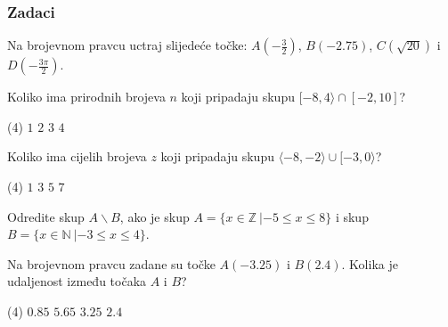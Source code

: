 \newpage

\subsubsection{Zadaci}

\setcounter{zadatak}{0}

\begin{zadatak}
    Na brojevnom pravcu uctraj slijedeće točke: $A\displaystyle \left(-\frac{3}{2}\right)$, $B(-2.75)$, $C\left(\sqrt{20}\right)$ i $D\left(\displaystyle-\frac{3\pi}{2}\right)$.

	\begin{center}\vspace{0.25cm}
	\end{center}
\end{zadatak}

\begin{zadatak}
    Koliko ima prirodnih brojeva $n$ koji pripadaju skupu $[ -8, 4 \rangle \cap [-2, 10]$?
    \begin{tasks}(4)
		\task $1$
		\task $2$
		\task $3$
		\task $4$
	\end{tasks}
\end{zadatak}

\begin{zadatak}
    Koliko ima cijelih brojeva $z$ koji pripadaju skupu $\langle -8, -2 \rangle \cup [-3, 0 \rangle$?
    \begin{tasks}(4)
		\task $1$
		\task $3$
		\task $5$
		\task $7$
	\end{tasks}
\end{zadatak}

\begin{zadatak}
    Odredite skup $A \backslash B$, ako je skup $A = \{ x \in \mathbb{Z} \ | -5 \leq x \leq 8 \}$ i skup $B = \{ x \in \mathbb{N} \ | -3 \leq x \leq 4 \}$.
\end{zadatak}

\begin{zadatak}
    Na brojevnom pravcu zadane su točke $A(-3.25)$ i $B(2.4)$.
	Kolika je udaljenost između točaka $A$ i $B$?
    \begin{tasks}(4)
		\task $0.85$
		\task $5.65$
		\task $3.25$
		\task $2.4$
	\end{tasks}
\end{zadatak}


